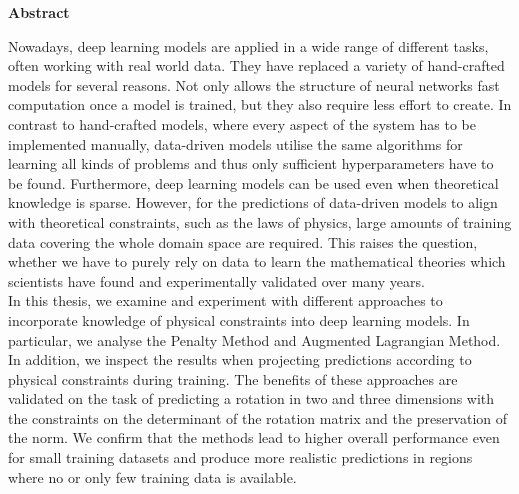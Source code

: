 


\vspace*{2cm}
\begin{center}
{\Large \textbf{Abstract}}
\end{center}
\vspace{1cm}


Nowadays, deep learning models are applied in a wide range of different tasks, often working with real world data. They have replaced a variety of hand-crafted models for several reasons. Not only allows the structure of neural networks fast computation once a model is trained, but they also require less effort to create. In contrast to hand-crafted models, where every aspect of the system has to be implemented manually, data-driven models utilise the same algorithms for learning all kinds of problems and thus only sufficient hyperparameters have to be found. Furthermore, deep learning models can be used even when theoretical knowledge is sparse. However, for the predictions of data-driven models to align with theoretical constraints, such as the laws of physics, large amounts of training data covering the whole domain space are required. This raises the question, whether we have to purely rely on data to learn the mathematical theories which scientists have found and experimentally validated over many years. \\
\indent In this thesis, we examine and experiment with different approaches to incorporate knowledge of physical constraints into deep learning models. In particular, we analyse the Penalty Method and Augmented Lagrangian Method. In addition, we inspect the results when projecting predictions according to physical constraints during training. The benefits of these approaches are validated on the task of predicting a rotation in two and three dimensions with the constraints on the determinant of the rotation matrix and the preservation of the norm. We confirm that the methods lead to higher overall performance even for small training datasets and produce more realistic predictions in regions where no or only few training data is available.
